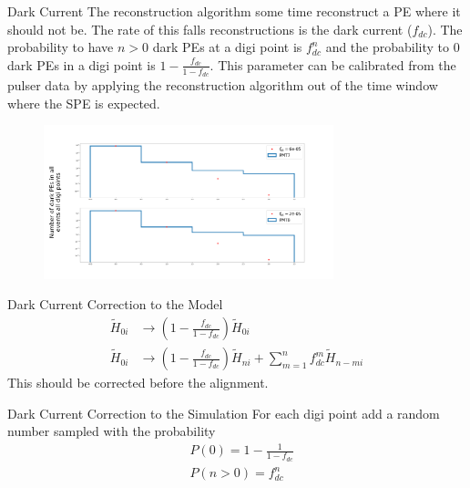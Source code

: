 \documentclass{beamer}
\begin{document}
\begin{frame}{Dark Current}
The reconstruction algorithm some time reconstruct a PE where it should not be. The rate of this falls reconstructions is the dark current ($f_{dc}$). The probability to have $n>0$ dark PEs at a digi point is $f_{dc}^n$ and the probability to 0 dark PEs in a digi point is $1-\frac{f_{dc}}{1-f_{dc}}$. This parameter can be calibrated from the pulser data by applying the reconstruction algorithm out of the time window where the SPE is expected.
\begin{figure}[h]
\includegraphics[width=0.75\textwidth]{f_dc.png}
\end{figure}
\end{frame}

\begin{frame}{Dark Current Correction to the Model}
\begin{equation}
\begin{split}
\tilde{H}_{0i}&\rightarrow \left(1-\frac{f_{dc}}{1-f_{dc}}\right)\tilde{H}_{0i}\\
\tilde{H}_{0i}&\rightarrow \left(1-\frac{f_{dc}}{1-f_{dc}}\right)\tilde{H}_{ni}+\sum_{m=1}^{n}f_{dc}^m\tilde{H}_{n-mi}
\end{split}
\end{equation}
This should be corrected before the alignment.
\end{frame}


\begin{frame}{Dark Current Correction to the Simulation}
For each digi point add a random number sampled with the probability
\begin{equation}
\begin{split}
&P(0)=1-\frac{1}{1-f_{dc}}\\
&P(n>0)=f_{dc}^n
\end{split}
\end{equation}
\end{frame}
\end{document}
